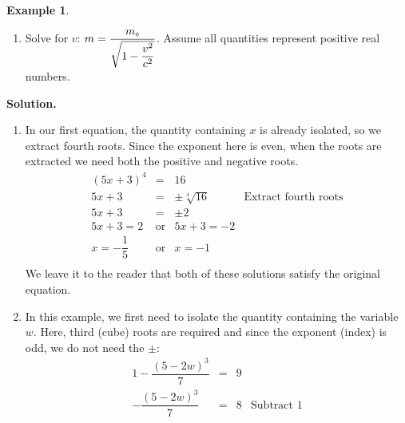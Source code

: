 \documentclass[11pt]{article}
\theoremstyle{definition}  %
\newtheorem{ex}{\bf Example}
\newcounter{HW}
\begin{document}
\begin{ex}
\begin{multicols}{2}
\begin{enumerate}
\setcounter{HW}{\value{enumi}}
\end{enumerate}
\end{multicols}

\begin{enumerate}

\setcounter{enumi}{\value{HW}}

\item  Solve for $v$:  $m = \dfrac{m_{\text{\tiny$0$}}}{\sqrt{1 - \dfrac{v^2}{c^2}}}$.  Assume all quantities represent positive real numbers.

\setcounter{enumi}{\value{HW}}

\end{enumerate}


{\bf Solution.}

\begin{enumerate}

\item  In our first equation, the quantity containing $x$ is already isolated, so we extract fourth roots. Since the exponent here is even, when the roots are extracted we need both the positive and negative roots. \[ \begin{array}{rclr}

(5x +3)^{4} & = & 16 & \\ [2pt]

5x+3 & = & \pm \sqrt[4]{16} & \text{Extract fourth roots} \\ [2pt]

5x + 3 & = & \pm 2 & \\ [2pt]

5x+3 = 2 & \text{or} & 5x+3 = -2 & \\

x = -\dfrac{1}{5} & \text{or} & x = -1 \\ \end{array} \] We leave it to the reader that both of these solutions satisfy the original equation.

\item  In this example, we first need to isolate the quantity containing the variable $w$.  Here, third (cube) roots are required and since the exponent (index) is odd, we do not need the $\pm$:\[ \begin{array}{rclr} 

1 - \dfrac{(5-2w)^3}{7} & = &  9 & \\ [8pt]


- \dfrac{(5-2w)^3}{7} & = & 8 & \text{Subtract $1$} \\[8pt]


\end{array}\]
\end{enumerate}
\end{ex}
\end{document}
